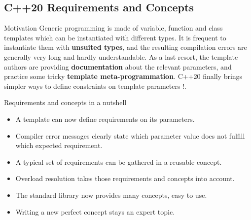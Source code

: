 \subsection[tmpl]{C++20 Requirements and Concepts}

\begin{frame}[fragile]
  \begin{block}{Motivation}
    Generic programming is made of variable, function and class templates
    which can be instantiated with different types. It is frequent
    to instantiate them with \textbf{unsuited types}, and the resulting
    compilation errors are generally very long and hardly understandable.
    As a last resort, the template authors are providing \textbf{documentation}
    about the relevant parameters, and practice some tricky
    \textbf{template meta-programmation}. C++20 finally brings simpler ways to
    define constraints on template parameters !.
  \end{block}
\end{frame}

\begin{frame}[fragile]
  \begin{block}{Requirements and concepts in a nutshell}
    \begin{itemize}
    \item A template can now define requirements on its parameters.
    \item Compiler error messages clearly state which parameter value does not fulfill which expected requirement.
    \item A typical set of requirements can be gathered in a reusable concept.
    \item Overload resolution takes those requirements and concepts into account.
    \item The standard library now provides many concepts, easy to use.
    \item Writing a new perfect concept stays an expert topic.
    \end{itemize}
  \end{block}
\end{frame}

